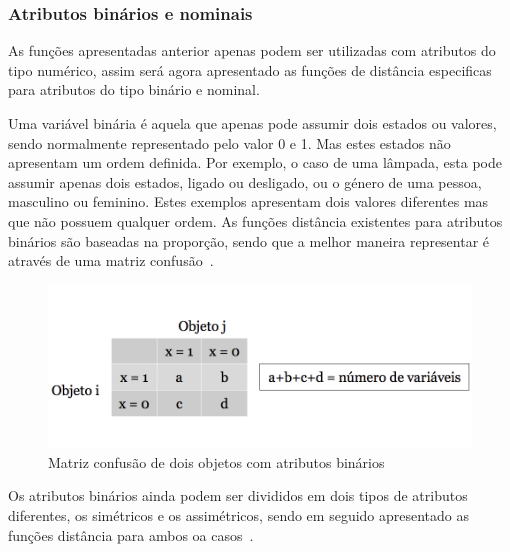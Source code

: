 \subsubsection{Atributos binários e nominais}

As funções apresentadas anterior apenas podem ser utilizadas com atributos do tipo numérico, assim será agora apresentado as funções de distância especificas para atributos do tipo binário e nominal.

Uma variável binária é aquela que apenas pode assumir dois estados ou valores, sendo normalmente representado pelo valor 0 e 1. Mas estes estados não apresentam um ordem definida. Por exemplo, o caso de uma lâmpada, esta pode assumir apenas dois estados, ligado ou desligado, ou o género de uma pessoa, masculino ou feminino. Estes exemplos apresentam dois valores diferentes mas que não possuem qualquer ordem. As funções distância existentes para atributos binários são baseadas na proporção, sendo que a melhor maneira representar é através de uma matriz confusão~\citet{Liu2011}.

\begin{figure}[h]
\centering
\includegraphics[width=0.8\linewidth]{./figures/matriz_confusao}
\caption{Matriz confusão de dois objetos com atributos binários}
\label{fig:matriz_confusão}
\end{figure}


Os atributos binários ainda podem ser divididos em dois tipos de atributos diferentes, os simétricos e os assimétricos, sendo em seguido apresentado as funções distância para ambos oa casos~\citet{Liu2011}.

